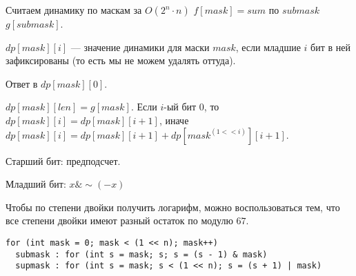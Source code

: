 Считаем динамику по маскам за $O(2^n \cdot n)$ $f[mask] = sum$ по $submask$ $g[submask]$.

$dp[mask][i]$ --- значение динамики для маски $mask$, если младшие $i$ бит в ней зафиксированы (то есть мы не можем удалять оттуда).

Ответ в $dp[mask][0]$.

$dp[mask][len] = g[mask]$.
Если $i$-ый бит 0, то $dp[mask][i] = dp[mask][i + 1]$, иначе $dp[mask][i] = dp[mask][i + 1] + dp[mask ^ (1 << i)][i + 1]$.

Старший бит: предподсчет.
 
Младший бит: $x \& \sim (-x)$ 

Чтобы по степени двойки получить логарифм, можно воспользоваться тем, что все степени двойки имеют разный остаток по модулю $67$.

\begin{verbatim}
for (int mask = 0; mask < (1 << n); mask++)
  submask : for (int s = mask; s; s = (s - 1) & mask)
  supmask : for (int s = mask; s < (1 << n); s = (s + 1) | mask)
\end{verbatim}

